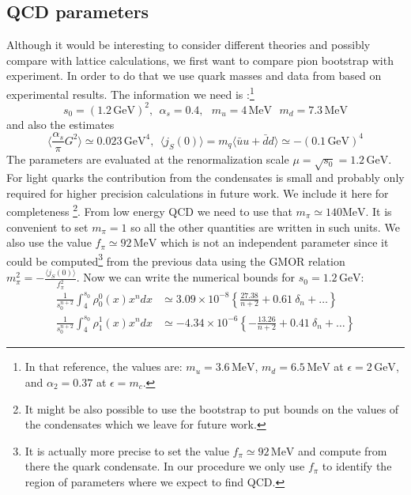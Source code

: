 \documentclass[12pt,letterpaper]{article}
\newcommand{\beq}{\begin{equation}}
\newcommand{\eeq}{\end{equation}}
\newcommand{\MeV}{\ensuremath{\mbox{MeV}}}
\newcommand{\GeV}{\ensuremath{\mbox{GeV}}}
\begin{document}
\subsection{QCD parameters}

 Although it would be interesting to consider different theories and possibly compare with lattice calculations, we first want to compare pion bootstrap with experiment. In order to do that we use quark masses and data from \cite{narison_2004} based on experimental results. The information we need is \cite{narison_2004}:\footnote{In that reference, the values are: $m_u=3.6\,\MeV$, $m_d=6.5\,\MeV$  at $\epsilon=2\,\GeV$, and $\alpha_2=0.37$ at $\epsilon=m_c$.}
\beq\label{qcddata1}
 s_0=(1.2\,\GeV)^2,\ \ \alpha_s=0.4, \ \ \ m_u = 4\,\MeV \ \ \ m_d = 7.3\,\MeV
\eeq
and also the estimates
\beq\label{qcddata2}
 \langle \frac{\alpha_s}{\pi}G^2\rangle \simeq 0.023\,\GeV^4, \ \  \langle j_S(0) \rangle=m_q\langle \bar{u}u+\bar{d}d\rangle \simeq -(0.1\,\GeV)^4
\eeq
The parameters are evaluated at the renormalization scale $\mu=\sqrt{s_0}=1.2\,\GeV$. 
For light quarks the contribution from the condensates is small and probably only required for higher precision calculations in future work. We include it here for completeness \footnote{It might be also possible to use the bootstrap to put bounds on the values of the condensates which we leave for future work.}. From low energy QCD we need to use that $m_\pi\simeq 140\MeV$. It is convenient to set $m_\pi=1$ so all the other quantities are written in such units. We also use the value $f_\pi\simeq 92\,\MeV$ which is not an independent parameter since it could be computed\footnote{It is actually more precise to set the value $f_\pi\simeq 92\,\MeV$ and compute from there the quark condensate. In our procedure we only use $f_\pi$ to identify the region of parameters where we expect to find QCD.} from the previous data using the GMOR\cite{PhysRev.175.2195} relation $m_\pi^2 = -\frac{\langle j_S(0)\rangle}{f_\pi^2}$.      
Now we can write the numerical bounds for $s_0=1.2\,\GeV$:
\begin{equation}\label{srnumbers}
	\begin{aligned}
	\frac{1}{s_0^{n+2}} \int_4^{s_0} \rho^0_0(x) x^n dx &\simeq  3.09\times 10^{-8} \left\{\frac{27.38}{n+2}+0.61\ \delta_n +\ldots\right\} \\
	\frac{1}{s_0^{n+2}} \int_4^{s_0} \rho^1_1(x) x^n dx &\simeq -4.34\times 10^{-6} \left\{-\frac{13.26}{n+2}+0.41\ \delta_n +\ldots\right\} 
	\end{aligned} 
\end{equation}
\end{document}
